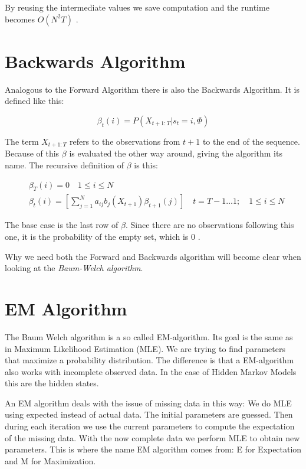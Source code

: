 By reusing the intermediate values we save computation and the runtime becomes $O(N^2 T)$ \parencite{huang2001spoken}. 

\section{Backwards Algorithm}

Analogous to the Forward Algorithm there is also the Backwards Algorithm. It is defined like this:

\begin{equation}
   \beta_{t}(i)=P\left(X_{t+1:T} | s_{t}=i, \Phi\right) 
\end{equation}

The term $X_{t+1:T}$ refers to the observations from $t+1$ to the end of the sequence. Because of this $\beta$ is evaluated the other way around, giving the algorithm its name. The recursive definition of $\beta$ is this:

\begin{equation}
\begin{aligned}
   &\beta_{T}(i)=0 \quad 1 \leq i \leq N  \\
   &\beta_{t}(i)=\left[\sum_{j=1}^{N} a_{i j} b_{j}\left(X_{t+1}\right) \beta_{t+1}(j)\right] \quad t=T-1 \ldots 1 ; \quad 1 \leq i \leq N
   \label{eq:beta-def}
\end{aligned}
\end{equation}

The base case is the last row of $\beta$. Since there are no observations following this one, it is the probability of the empty set, which is 0 \parencite{huang2001spoken}.

Why we need both the Forward and Backwards algorithm will become clear when looking at the \emph{Baum-Welch algorithm}.

\section{EM Algorithm}

The Baum Welch algorithm is a so called EM-algorithm. Its goal is the same as in Maximum Likelihood Estimation (MLE). We are trying to find parameters that maximize a probability distribution. The difference is that a EM-algorithm also works with incomplete observed data. In the case of Hidden Markov Models this are the hidden states. 

An EM algorithm deals with the issue of missing data in this way: We do MLE using expected instead of actual data. The initial parameters are guessed. Then during each iteration we use the current parameters to compute the expectation of the missing data. With the now complete data we perform MLE to obtain new parameters. This is where the name EM algorithm comes from: E for Expectation and M for Maximization. 
 
